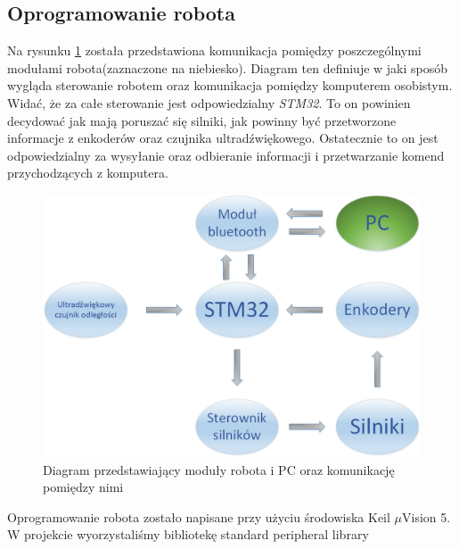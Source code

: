 \documentclass[a4paper]{article}
\begin{document}
\subsection{Oprogramowanie robota}
Na rysunku \ref{moduly_robota_pc} została przedstawiona komunikacja pomiędzy poszczególnymi modułami robota(zaznaczone na niebiesko). Diagram ten definiuje w jaki sposób wygląda sterowanie robotem oraz komunikacja pomiędzy komputerem osobistym. Widać, że za całe sterowanie jest odpowiedzialny \textit{STM32}. To on powinien decydować jak mają poruszać się silniki, jak powinny być przetworzone informacje z enkoderów oraz czujnika ultradźwiękowego. Ostatecznie to on jest odpowiedzialny za wysyłanie oraz odbieranie informacji i przetwarzanie komend przychodzących z komputera. 
\begin{figure}[H]
\centering
\includegraphics[width=\linewidth]{diagram_komunikacji_modulow_img}
\caption{Diagram przedstawiający moduły robota i PC oraz komunikację pomiędzy nimi}
\label{moduly_robota_pc}
\end{figure}

Oprogramowanie robota zostało napisane przy użyciu środowiska Keil $\mu$Vision 5. W projekcie wyorzystaliśmy bibliotekę standard peripheral library
\end{document}
